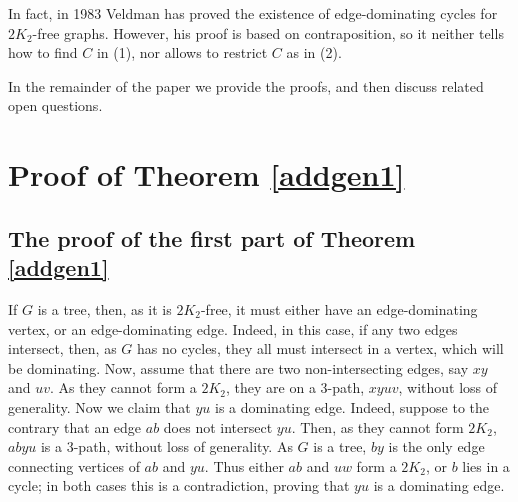 \documentclass[runningheads,a4paper]{llncs}
\begin{document}
In fact, in 1983 Veldman \cite{veldman83} has proved the existence of
edge-dominating cycles for $2K_2$-free graphs. However, his proof is based on
contraposition, so it neither tells how to find $C$ in (1), nor
allows to restrict $C$ as in (2).

In the remainder of the paper we provide the proofs, and then discuss related 
open questions.


\section{Proof of Theorem \ref{addgen1}}

\subsection{The proof of the first part of Theorem \ref{addgen1}}
If $G$ is a tree, then, as it is $2K_2$-free, it must either have an edge-dominating
vertex, or an edge-dominating edge.
Indeed, in this case, if any two edges intersect, then, as $G$ has no cycles, 
they all must intersect in a vertex, which will be dominating. Now, assume that there are
two non-intersecting edges, say $xy$ and $uv$. As they cannot form a $2K_2$, they are on
a 3-path, $xyuv$, without loss of generality. Now we claim that $yu$ is a dominating edge.
Indeed, suppose to the contrary that an edge $ab$ does not intersect $yu$. Then, as they
cannot form $2K_2$, $abyu$ is a 3-path, without loss of generality. As $G$ is a tree, $by$
is the only edge connecting vertices of $ab$ and $yu$. Thus either
$ab$ and $uw$ form a $2K_2$, or $b$ lies in a cycle; in both cases this is a contradiction, 
proving that $yu$ is a dominating edge.
\end{document}
